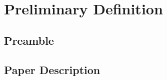 
\chapter{Preliminary Definition} %

\label{AppendixDef} %



\section{Preamble}
\label{sec:def_preamble}


\section{Paper Description}
\label{sec:def_paper_description}

\makeatletter

\makeatother
